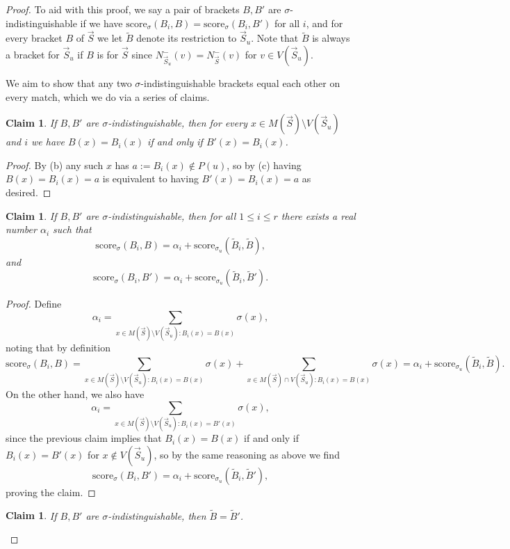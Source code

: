 \documentclass[12pt,letterpaper]{article}
\newtheorem{claim}[thm]{Claim}
\theoremstyle{definition}
\newcommand{\al}{\alpha}
\newcommand{\sig}{\sigma}
\renewcommand{\1}{\mathbbm{1}}
\newcommand{\sm}{\setminus}
\newcommand{\score}{\mathrm{score}}
\newcommand{\tour}{\vec{S}}
\begin{document}
\begin{proof}
	To aid with this proof, we say a pair of brackets $B,B'$ are $\sig$-indistinguishable if we have $\score_\sig(B_i,B)=\score_\sig(B_i,B')$ for all $i$, and for every bracket $B$ of $\tour$ we let $\widetilde{B}$ denote its restriction to $\tour_u$.  Note that $\widetilde{B}$ is always a bracket for $\tour_u$ if $B$ is for $\tour$ since $N^-_{\tour_u}(v)=N^-_{\tour}(v)$ for $v\in V(\tour_u)$.
	
	We aim to show that any two $\sig$-indistinguishable brackets equal each other on every match, which we do via a series of claims.
	\begin{claim}
		If $B,B'$ are $\sig$-indistinguishable, then for every $x\in M(\tour)\sm V(\tour_u)$ and $i$ we have $B(x)=B_i(x)$ if and only if $B'(x)=B_i(x)$.
	\end{claim}
	\begin{proof}
		By (b) any such $x$ has $a:=B_i(x)\notin P(u)$, so by (c) having $B(x)=B_i(x)=a$ is equivalent to having $B'(x)=B_i(x)=a$ as desired.
	\end{proof}
	\begin{claim}
		If $B,B'$ are $\sig$-indistinguishable, then for all $1\le i\le r$ there exists a real number $\al_i$ such that
		\[\score_\sig(B_i,B)=\al_i+\score_{\sig_u}(\widetilde{B}_i,\widetilde{B}),\]
		and
		\[\score_\sig(B_i,B')=\al_i+\score_{\sig_u}(\widetilde{B}_i,\widetilde{B}').\]
	\end{claim}
	\begin{proof}
		Define \[\al_i=\sum_{x\in M(\tour)\sm V(\tour_u):B_i(x)=B(x)} \sig(x),\]
		noting that by definition
		\[\score_\sig(B_i,B)=\sum_{x\in M(\tour)\sm V(\tour_u):B_i(x)=B(x)} \sig(x)+\sum_{x\in M(\tour)\cap V(\tour_u):B_i(x)=B(x)} \sig(x)=\al_i+\score_{\sig_u}(\widetilde{B}_i,\widetilde{B}).\]
		On the other hand, we also have \[\al_i=\sum_{x\in M(\tour)\sm V(\tour_u):B_i(x)=B'(x)} \sig(x),\] since the previous claim implies that $B_i(x)=B(x)$ if and only if $B_i(x)=B'(x)$ for $x\notin V(\tour_u)$, so by the same reasoning as above we find
		\[\score_\sig(B_i,B')=\al_i+\score_{\sig_u}(\widetilde{B}_i,\widetilde{B}'),\]
		proving the claim.
	\end{proof}
	\begin{claim}\label{Claim lifting and restrictions}
		If $B,B'$ are $\sig$-indistinguishable, then $\widetilde{B}=\widetilde{B}'$.
	\end{claim}

\end{proof}
\end{document}
